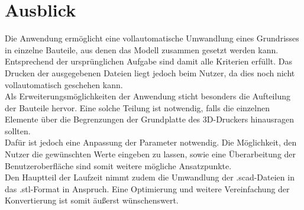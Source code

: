 \chapter{Ausblick}
Die Anwendung ermöglicht eine vollautomatische Umwandlung eines Grundrisses in einzelne Bauteile, aus denen das Modell zusammen gesetzt werden kann.
Entsprechend der ursprünglichen Aufgabe sind damit alle Kriterien erfüllt.
Das Drucken der ausgegebenen Dateien liegt jedoch beim Nutzer, da dies noch nicht vollautomatisch geschehen kann. \\

Als Erweiterungsmöglichkeiten der Anwendung sticht besonders die Aufteilung der Bauteile hervor.
Eine solche Teilung ist notwendig, falls die einzelnen Elemente über die Begrenzungen der Grundplatte des 3D-Druckers hinausragen sollten. \\

Dafür ist jedoch eine Anpassung der Parameter notwendig.
Die Möglichkeit, den Nutzer die gewünschten Werte eingeben zu lassen, sowie eine Überarbeitung der Benutzeroberfläche sind somit weitere mögliche Ansatzpunkte. \\

Den Hauptteil der Laufzeit nimmt zudem die Umwandlung der .scad-Dateien in das .stl-Format in Anspruch.
Eine Optimierung und weitere Vereinfachung der Konvertierung ist somit äußerst wünschenswert.

